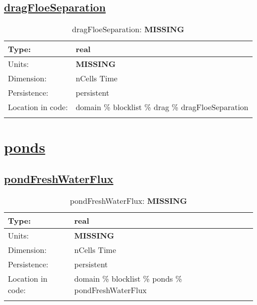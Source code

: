 \subsection[dragFloeSeparation]{\hyperref[sec:var_tab_drag]{dragFloeSeparation}}
\label{subsec:var_sec_drag_dragFloeSeparation}
\begin{center}
\begin{longtable}{| p{2.0in} | p{4.0in} |}
        \hline 
        Type: & real \\
        \hline 
        Units: & {\bf \color{red} MISSING} \\
        \hline 
        Dimension: & nCells Time \\
        \hline 
        Persistence: & persistent \\
        \hline 
         Location in code: & domain \% blocklist \% drag \% dragFloeSeparation \\
         \hline 
    \caption{dragFloeSeparation: {\bf \color{red} MISSING}}
\end{longtable}
\end{center}
\section[ponds]{\hyperref[sec:var_tab_ponds]{ponds}}
\label{sec:var_sec_ponds}
\subsection[pondFreshWaterFlux]{\hyperref[sec:var_tab_ponds]{pondFreshWaterFlux}}
\label{subsec:var_sec_ponds_pondFreshWaterFlux}
\begin{center}
\begin{longtable}{| p{2.0in} | p{4.0in} |}
        \hline 
        Type: & real \\
        \hline 
        Units: & {\bf \color{red} MISSING} \\
        \hline 
        Dimension: & nCells Time \\
        \hline 
        Persistence: & persistent \\
        \hline 
         Location in code: & domain \% blocklist \% ponds \% pondFreshWaterFlux \\
         \hline 
    \caption{pondFreshWaterFlux: {\bf \color{red} MISSING}}
\end{longtable}
\end{center}

